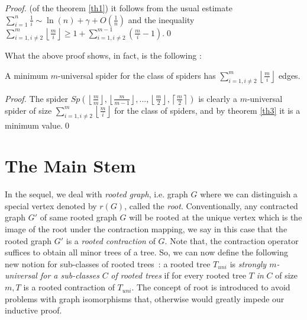 \documentclass{llncs}
\begin{document}
\begin{proof} (of the theorem \ref{th1}) it follows from the usual estimate
$\sum\limits_{i = 1}^n {\frac{1}{i}} \sim \ln \left( n \right) +
\gamma + O\left( {\frac{1}{n}} \right)$ and the inequality
$\sum\limits_{i = 1, i \ne 2}^m {\left\lfloor {\frac{m}{i}}
\right\rfloor} \ge 1 + \sum\limits_{
 i = 1,
 i \ne 2}^{m - 1} {\left( {\frac{m}{i} - 1} \right)} $.\qed
\end{proof}

What the above proof shows, in fact, is the following :





\begin{corollary}A minimum $m$-universal spider for the class of
spiders has $\sum\limits_{
 i = 1,
 i \ne 2}^m {\left\lfloor {\frac{m}{i}} \right\rfloor } $ edges.
\end{corollary}




\begin{proof}The spider $Sp\left( {\left\lfloor {\frac{m}{m}} \right\rfloor
,\left\lfloor {\frac{m}{m-1}} \right\rfloor ,...,\left\lfloor
{\frac{m}{2}} \right\rfloor,\left\lceil {\frac{m}{2}}\right\rceil
} \right)$ is clearly a $m$-universal spider of size
$\sum\limits_{
 i = 1,
 i \ne 2}^m {\left\lfloor {\frac{m}{i}} \right\rfloor } $ for the class of
spiders, and by theorem \ref{th3} it is a minimum value.\qed
\end{proof}




\section{The Main Stem}





In the sequel, we deal with\textit{ rooted graph}, i.e. graph $G$
where we can distinguish a special vertex denoted by $r(G)$,
called the \textit{root}. Conventionally, any contracted graph
${G}'$ of same rooted graph $G$ will be rooted at the unique
vertex which is the image of the root under the contraction
mapping, we say in this case that the rooted graph ${G}'$ is a
\textit{rooted contraction} of $G$. Note that, the contraction
operator suffices to obtain all minor trees of a tree. So, we can
now define the following new notion for sub-classes of rooted
trees~: a rooted tree $T_{uni} $ is\textit{ strongly $m$-universal
for a sub-classes }$C$\textit{ of rooted trees} if for every
rooted tree $T$\textit{ in }$C$ of size $m, T$ is a rooted
contraction of $T_{uni} $. The concept of root is introduced to
avoid problems with graph isomorphisms that, otherwise would
greatly impede our inductive proof.
\end{document}
